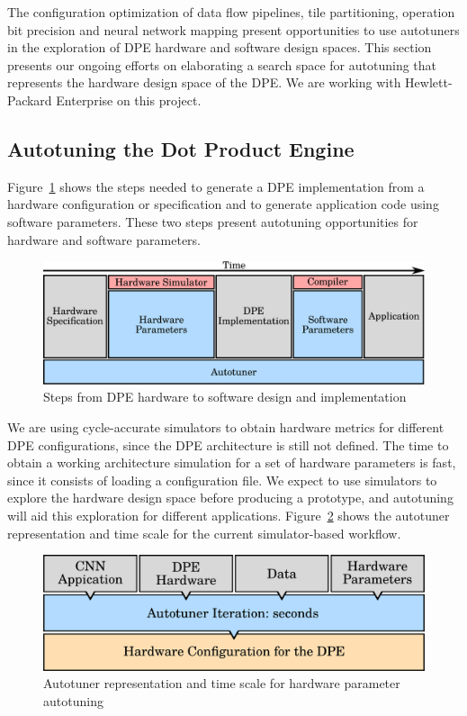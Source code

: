 The configuration optimization of data flow pipelines, tile partitioning,
operation bit precision and neural network mapping present opportunities to use
autotuners in the exploration of DPE hardware and software design spaces.  This
section presents our ongoing efforts on elaborating a search space for
autotuning that represents the hardware design space of the DPE.  We are
working with Hewlett-Packard Enterprise on this project.

\subsection{Autotuning the Dot Product Engine}

Figure~\ref{fig:dpe-stack} shows the steps needed to generate a DPE
implementation from a hardware configuration or specification and to generate
application code using software parameters. These two steps present
autotuning opportunities for hardware and software parameters.

\begin{figure}[htpb]
    \centering
    \includegraphics[width=.65\textwidth]{./images/dpe-stack}
    \caption{Steps from DPE hardware to software design and implementation}
    \label{fig:dpe-stack}
\end{figure}

We are using cycle-accurate simulators to obtain hardware metrics for different
DPE configurations, since the DPE architecture is still not defined.  The time
to obtain a working architecture simulation for a set of hardware parameters is
fast, since it consists of loading a configuration file.  We expect to use
simulators to explore the hardware design space before producing a prototype,
and autotuning will aid this exploration for different applications.
Figure~\ref{fig:overview-dpe-hard} shows the autotuner representation and time
scale for the current simulator-based workflow.

\begin{figure}[htpb]
    \centering
    \includegraphics[width=.65\textwidth]{./images/overview_dpe_hard}
    \caption{Autotuner representation and time scale for hardware parameter
    autotuning}
    \label{fig:overview-dpe-hard}
\end{figure}

